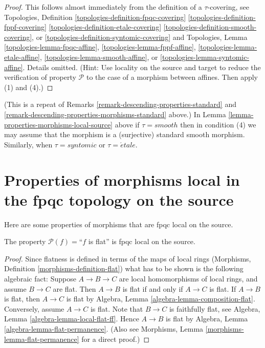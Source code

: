 \begin{proof}
This follows almost immediately from the definition of
a $\tau$-covering, see
Topologies, Definition
\ref{topologies-definition-fpqc-covering}
\ref{topologies-definition-fppf-covering}
\ref{topologies-definition-etale-covering}
\ref{topologies-definition-smooth-covering}, or
\ref{topologies-definition-syntomic-covering}
and Topologies, Lemma
\ref{topologies-lemma-fpqc-affine},
\ref{topologies-lemma-fppf-affine},
\ref{topologies-lemma-etale-affine},
\ref{topologies-lemma-smooth-affine}, or
\ref{topologies-lemma-syntomic-affine}.
Details omitted. (Hint: Use locality on the source and target to
reduce the verification of property $\mathcal{P}$ to the case of
a morphism between affines. Then apply (1) and (4).)
\end{proof}

\begin{remark}
\label{remark-properties-morphisms-local-source-standard}
(This is a repeat of
Remarks \ref{remark-descending-properties-standard}
and \ref{remark-descending-properties-morphisms-standard} above.)
In Lemma \ref{lemma-properties-morphisms-local-source} above if
$\tau = smooth$ then in condition (4) we may assume that
the morphism is a (surjective) standard smooth morphism.
Similarly, when $\tau = syntomic$ or $\tau = \acute{e}tale$.
\end{remark}



\section{Properties of morphisms local in the fpqc topology on the source}
\label{section-fpqc-local-source}

\noindent
Here are some properties of morphisms that are fpqc local on the source.

\begin{lemma}
\label{lemma-flat-fpqc-local-source}
The property $\mathcal{P}(f)=$``$f$ is flat'' is fpqc local on the source.
\end{lemma}

\begin{proof}
Since flatness is defined in terms of the maps of local rings
(Morphisms, Definition \ref{morphisms-definition-flat})
what has to be shown is the following
algebraic fact: Suppose $A \to B \to C$ are local homomorphisms of local
rings, and assume $B \to C$ are flat. Then $A \to B$ is
flat if and only if $A \to C$ is flat.
If $A \to B$ is flat, then $A \to C$ is flat by
Algebra, Lemma \ref{algebra-lemma-composition-flat}.
Conversely, assume $A \to C$ is flat.
Note that $B \to C$ is faithfully
flat, see
Algebra, Lemma \ref{algebra-lemma-local-flat-ff}.
Hence $A \to B$ is flat by
Algebra, Lemma \ref{algebra-lemma-flat-permanence}.
(Also see Morphisms, Lemma \ref{morphisms-lemma-flat-permanence}
for a direct proof.)
\end{proof}

